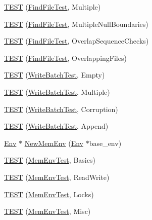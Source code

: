 \begin{DoxyCompactItemize}
\item 
\hyperlink{namespaceleveldb_a6ae343add2f7159a8d66341f271a99c2}{T\+E\+S\+T} (\hyperlink{classleveldb_1_1_find_file_test}{Find\+File\+Test}, Multiple)
\item 
\hyperlink{namespaceleveldb_ac9911f7a50cf3a0d5ddc4533910054a1}{T\+E\+S\+T} (\hyperlink{classleveldb_1_1_find_file_test}{Find\+File\+Test}, Multiple\+Null\+Boundaries)
\item 
\hyperlink{namespaceleveldb_a22fa4bca5e930976bcd623786011a180}{T\+E\+S\+T} (\hyperlink{classleveldb_1_1_find_file_test}{Find\+File\+Test}, Overlap\+Sequence\+Checks)
\item 
\hyperlink{namespaceleveldb_a60968bf0debd7046229d2da8d0a823c3}{T\+E\+S\+T} (\hyperlink{classleveldb_1_1_find_file_test}{Find\+File\+Test}, Overlapping\+Files)
\item 
\hyperlink{namespaceleveldb_a77a1389346b24fa9b5f9698400c865f6}{T\+E\+S\+T} (\hyperlink{classleveldb_1_1_write_batch_test}{Write\+Batch\+Test}, Empty)
\item 
\hyperlink{namespaceleveldb_af2029a94a0a17d6eb1bfec4d38b7e3a0}{T\+E\+S\+T} (\hyperlink{classleveldb_1_1_write_batch_test}{Write\+Batch\+Test}, Multiple)
\item 
\hyperlink{namespaceleveldb_a8021231dcd7fd48d082ecf965a2b8230}{T\+E\+S\+T} (\hyperlink{classleveldb_1_1_write_batch_test}{Write\+Batch\+Test}, Corruption)
\item 
\hyperlink{namespaceleveldb_a6b1521832d07ed987bc4ea6c3867bd00}{T\+E\+S\+T} (\hyperlink{classleveldb_1_1_write_batch_test}{Write\+Batch\+Test}, Append)
\item 
\hyperlink{classleveldb_1_1_env}{Env} $\ast$ \hyperlink{namespaceleveldb_a15271a802c68de223ea56b4b26e83519}{New\+Mem\+Env} (\hyperlink{classleveldb_1_1_env}{Env} $\ast$base\+\_\+env)
\item 
\hyperlink{namespaceleveldb_a0bec4396e504d47207110edc4a11f302}{T\+E\+S\+T} (\hyperlink{classleveldb_1_1_mem_env_test}{Mem\+Env\+Test}, Basics)
\item 
\hyperlink{namespaceleveldb_aaee612d19267a7183555aee571cd1415}{T\+E\+S\+T} (\hyperlink{classleveldb_1_1_mem_env_test}{Mem\+Env\+Test}, Read\+Write)
\item 
\hyperlink{namespaceleveldb_ab388329216765ab6e37e34b4ac778991}{T\+E\+S\+T} (\hyperlink{classleveldb_1_1_mem_env_test}{Mem\+Env\+Test}, Locks)
\item 
\hyperlink{namespaceleveldb_a57beb72845ed55c4cc316709f14670da}{T\+E\+S\+T} (\hyperlink{classleveldb_1_1_mem_env_test}{Mem\+Env\+Test}, Misc)

\end{DoxyCompactItemize}
